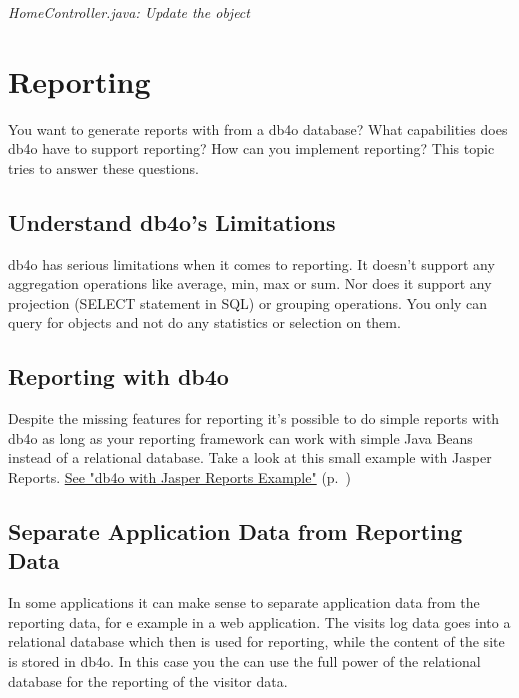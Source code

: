 {\small\itshape HomeController.java: Update the object\par}
\medskip

\section{Reporting}
\label{ref:platform-specific-issues-reporting}

You want to generate reports with from a db4o database? What capabilities does db4o have to support reporting? How can you implement reporting? This topic tries to answer these questions.

\subsection*{Understand db4o's Limitations}

db4o has serious limitations when it comes to reporting. It doesn't support any aggregation operations like average, min, max or sum. Nor does it support any projection (SELECT statement in SQL) or grouping operations. You only can query for objects and not do any statistics or selection on them.

\subsection*{Reporting with db4o}

Despite the missing features for reporting it's possible to do simple reports with db4o as long as your reporting framework can work with simple Java Beans instead of a relational database. Take a look at this small example with Jasper Reports. \hyperref[ref:platform-specific-issues-reporting-db4o-with-jasper]{See "db4o with Jasper Reports Example"} (p.~\pageref{ref:platform-specific-issues-reporting-db4o-with-jasper})

\subsection*{Separate Application Data from Reporting Data}

In some applications it can make sense to separate application data from the reporting data, for e example in a web application. The visits log data goes into a relational database which then is used for reporting, while the content of the site is stored in db4o. In this case you the can use the full power of the relational database for the reporting of the visitor data.

